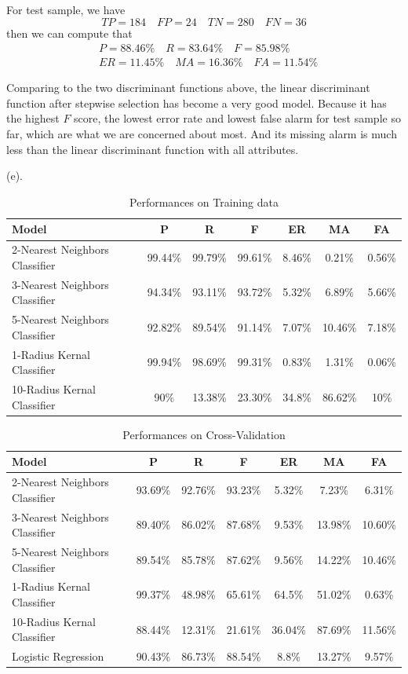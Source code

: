 \documentclass[letterpaper, 12pt]{article}
\newcommand{\ba}{$$\begin{aligned}}
\newcommand{\ea}{\end{aligned}$$}
\begin{document}
For test sample, we have
$$
TP=184\quad FP=24\quad TN=280\quad FN=36
$$
then we can compute that
\ba
&P=88.46\%\quad R=83.64\%\quad F=85.98\%\\
&ER=11.45\%\quad MA=16.36\%\quad FA=11.54\%
\ea

Comparing to the two discriminant functions above, the linear discriminant function after stepwise selection has become a very good model. Because it has the highest $F$ score, the lowest error rate and lowest false alarm for test sample so far, which are what we are concerned about most. And its missing alarm is much less than the linear discriminant function with all attributes.


(e).\begin{table}
\centering
\begin{tabular}{|l|c|c|c|c|c|c|}
\hline
Model&P&R&F&ER\footnotemark[2]&MA&FA\\
\hline
2-Nearest Neighbors Classifier&99.44\%&99.79\%&99.61\%&8.46\%&0.21\%&0.56\%\\
\hline
3-Nearest Neighbors Classifier&94.34\%&93.11\%&93.72\%&5.32\%&6.89\%&5.66\%\\
\hline
5-Nearest Neighbors Classifier&92.82\%&89.54\%&91.14\%&7.07\%&10.46\%&7.18\%\\
\hline
1-Radius Kernal Classifier&99.94\%&98.69\%&99.31\%&0.83\%&1.31\%&0.06\%\\
\hline
10-Radius Kernal Classifier&90\%&13.38\%&23.30\%&34.8\%&86.62\%&10\%\\
\hline
\end{tabular}
\caption{Performances on Training data}\label{tab1}
\end{table}
\begin{table}
\centering
\begin{tabular}{|l|c|c|c|c|c|c|}
\hline
Model&P&R&F&ER&MA&FA\\
\hline
2-Nearest Neighbors Classifier&93.69\%&92.76\%&93.23\%&5.32\%&7.23\%&6.31\%\\
\hline
3-Nearest Neighbors Classifier&89.40\%&86.02\%&87.68\%&9.53\%&13.98\%&10.60\%\\
\hline
5-Nearest Neighbors Classifier&89.54\%&85.78\%&87.62\%&9.56\%&14.22\%&10.46\%\\
\hline
1-Radius Kernal Classifier&99.37\%&48.98\%&65.61\%&64.5\%&51.02\%&0.63\%\\
\hline
10-Radius Kernal Classifier&88.44\%&12.31\%&21.61\%&36.04\%&87.69\%&11.56\%\\
\hline
Logistic Regression\footnotemark[3]&90.43\%&86.73\%&88.54\%&8.8\%&13.27\%&9.57\%\\
\hline
\end{tabular}
\caption{Performances on Cross-Validation}\label{tab2}
\end{table}
\end{document}
